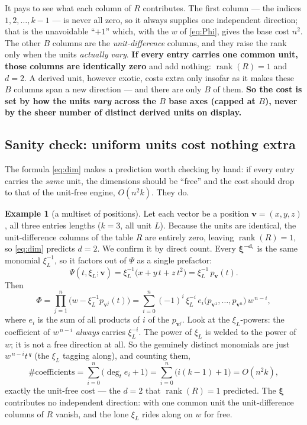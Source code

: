 \documentclass[11pt,a4paper]{article}
\theoremstyle{definition}
\newtheorem{example}[definition]{Example}
\theoremstyle{plain}
\newcommand{\bvec}[1]{\mathbf{#1}}
\begin{document}
It pays to see what each column of $R$ contributes. The first column --- the
indices $1,2,\dots,k-1$ --- is never all zero, so it always supplies one independent
direction; that is the unavoidable ``$+1$'' which, with the $w$ of \eqref{eq:Phi},
gives the base cost $n^2$. The other $B$ columns are the \emph{unit-difference}
columns, and they raise the rank only when the units \emph{actually vary}.
\textbf{If every entry carries one common unit, those columns are identically zero}
and add nothing: $\operatorname{rank}(R)=1$ and $d=2$. A derived unit, however exotic,
costs extra only insofar as it makes these $B$ columns span a new direction --- and
there are only $B$ of them. \textbf{So the cost is set by how the units \emph{vary}
across the $B$ base axes (capped at $B$), never by the sheer number of distinct
derived units on display.}

\subsection{Sanity check: uniform units cost nothing extra}

The formula \eqref{eq:dim} makes a prediction worth checking by hand: if every
entry carries the \emph{same} unit, the dimensions should be ``free'' and the cost
should drop to that of the unit-free engine, $O(n^2k)$. They do.

\begin{example}[a multiset of positions]\label{ex:positions}
Let each vector be a position $\bvec v=(x,y,z)$, all three entries lengths
($k=3$, all unit $L$). Because the units are identical, the unit-difference columns
of the table $R$ are entirely zero, leaving $\operatorname{rank}(R)=1$, so
\eqref{eq:dim} predicts $d=2$. We confirm it by direct count. Every
$\boldsymbol\xi^{-\bvec d_i}$ is the same monomial
$\xi_L^{-1}$, so it factors out of $\Psi$ as a single prefactor:
\[
   \Psi(t,\xi_L;\bvec v)=\xi_L^{-1}\bigl(x+y\,t+z\,t^2\bigr)
       =\xi_L^{-1}\,p_{\bvec v}(t).
\]
Then
\[
   \Phi=\prod_{j=1}^n\bigl(w-\xi_L^{-1}p_{\bvec v^j}(t)\bigr)
       =\sum_{i=0}^n(-1)^i\,\xi_L^{-i}\,e_i\!\bigl(p_{\bvec v^1},\dots,p_{\bvec v^n}\bigr)\,
        w^{\,n-i},
\]
where $e_i$ is the sum of all products of $i$ of the $p_{\bvec v^j}$. Look at the
$\xi_L$-powers: the coefficient of $w^{\,n-i}$ \emph{always} carries $\xi_L^{-i}$.
The power of $\xi_L$ is welded to the power of $w$; it is not a free direction at
all. So the genuinely distinct monomials are just $w^{\,n-i}t^{\,q}$ (the $\xi_L$
tagging along), and counting them,
\[
   \#\text{coefficients}=\sum_{i=0}^{n}\bigl(\deg_t e_i+1\bigr)
   =\sum_{i=0}^n\bigl(i(k-1)+1\bigr)=O(n^2k),
\]
exactly the unit-free cost --- the $d=2$ that $\operatorname{rank}(R)=1$ predicted.
The $\boldsymbol\xi$ contributes no independent direction: with one common unit the
unit-difference columns of $R$ vanish, and the lone $\xi_L$ rides along on $w$ for
free.
\end{example}
\end{document}
